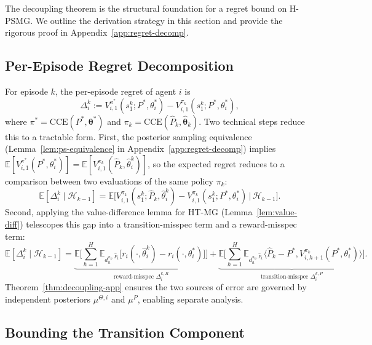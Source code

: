 The decoupling theorem is the structural foundation for a regret bound on H-PSMG. We outline the derivation strategy in this section and provide the rigorous proof in Appendix~\ref{app:regret-decomp}.

\subsection{Per-Episode Regret Decomposition}

For episode $k$, the per-episode regret of agent $i$ is
\begin{equation}
\Delta_i^k := V_{i,1}^{\pi^*}(s_1^k; P^*, \theta_i^*) - V_{i,1}^{\pi_k}(s_1^k; P^*, \theta_i^*),
\end{equation}
where $\pi^* = \mathrm{CCE}(P^*, \boldsymbol{\theta}^*)$ and $\pi_k = \mathrm{CCE}(\hat{P}_k, \hat{\boldsymbol{\theta}}_k)$. Two technical steps reduce this to a tractable form. First, the posterior sampling equivalence (Lemma~\ref{lem:ps-equivalence} in Appendix~\ref{app:regret-decomp}) implies $\mathbb{E}[V_{i,1}^{\pi^*}(P^*, \theta_i^*)] = \mathbb{E}[V_{i,1}^{\pi_k}(\hat{P}_k, \hat{\theta}_i^k)]$, so the expected regret reduces to a comparison between two evaluations of the same policy $\pi_k$:
\begin{equation}
\mathbb{E}[\Delta_i^k \mid \mathcal{H}_{k-1}] = \mathbb{E}\big[V_{i,1}^{\pi_k}(s_1^k; \hat{P}_k, \hat{\theta}_i^k) - V_{i,1}^{\pi_k}(s_1^k; P^*, \theta_i^*) \,\big|\, \mathcal{H}_{k-1}\big].
\end{equation}
Second, applying the value-difference lemma for HT-MG (Lemma~\ref{lem:value-diff}) telescopes this gap into a transition-misspec term and a reward-misspec term:
\begin{equation}
\mathbb{E}[\Delta_i^k \mid \mathcal{H}_{k-1}] = \underbrace{\mathbb{E}\Big[\sum_{h=1}^H \mathbb{E}_{d_h^{\pi_k, \hat{P}_k}}\big[r_i(\cdot, \hat{\theta}_i^k) - r_i(\cdot, \theta_i^*)\big]\Big]}_{\text{reward-misspec } \Delta_i^{k,R}} + \underbrace{\mathbb{E}\Big[\sum_{h=1}^H \mathbb{E}_{d_h^{\pi_k, \hat{P}_k}}\big\langle \hat{P}_k - P^*, V_{i,h+1}^{\pi_k}(P^*, \theta_i^*)\big\rangle\Big]}_{\text{transition-misspec } \Delta_i^{k,P}}.
\end{equation}
Theorem~\ref{thm:decoupling-app} ensures the two sources of error are governed by independent posteriors $\mu^{\Theta,i}$ and $\mu^P$, enabling separate analysis.

\subsection{Bounding the Transition Component}

